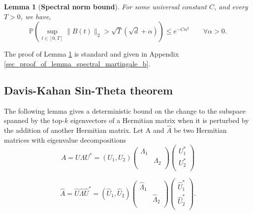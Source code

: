\documentclass[11pt,letterpaper]{article}
\newtheorem{lemma}[theorem]{Lemma}
\begin{document}
\begin{lemma}[\bf Spectral norm bound] \label{lemma_spectral_martingale_b}
 For some universal constant $C$, and every $T>0$, we have,
%
      $$ \mathbb{P}\left(\sup_{t \in [0,T]}\|B(t)\|_2 > \sqrt{T}(\sqrt{d} + \alpha)\right) \leq e^{-C \alpha^2} \qquad \forall \alpha >0.$$
%
\end{lemma}
%
\noindent
The proof of Lemma \ref{lemma_spectral_martingale_b} is standard and given in Appendix \ref{sec_proof_of_lemma_spectral_martingale_b}.

\subsection{Davis-Kahan Sin-Theta theorem}

The following lemma gives a deterministic bound on the change to the subspace spanned by the top-$k$ eigenvectors of a Hermitian matrix when it is perturbed by the addition of another Hermitian matrix.
%
Let A and $\hat{A}$ be two Hermitian matrices with eigenvalue decompositions
%
\begin{equation}\label{eq_eigenvalue_decomposition1}
    A = U \Lambda U^\ast = (U_1, U_2) \left({\begin{array}{cc}
   \Lambda_1 &  \\
    &  \Lambda_2 \\
  \end{array}}  \right) \left({\begin{array}{c}
   U_1^\ast \\
      U_2^\ast \\
  \end{array}}  \right)
\end{equation}

\begin{equation}\label{eq_eigenvalue_decomposition2}
    \hat{A} = \hat{U} \hat{\Lambda} \hat{U}^\ast = (\hat{U}_1, \hat{U}_2) \left({\begin{array}{cc}
   \hat{\Lambda}_1 &  \\
    &   \hat{\Lambda}_2 \\
  \end{array}}  \right) \left({\begin{array}{c}
    \hat{U}_1^\ast \\
       \hat{U}_2^\ast \\
  \end{array}}  \right).
\end{equation}
%
\end{document}
